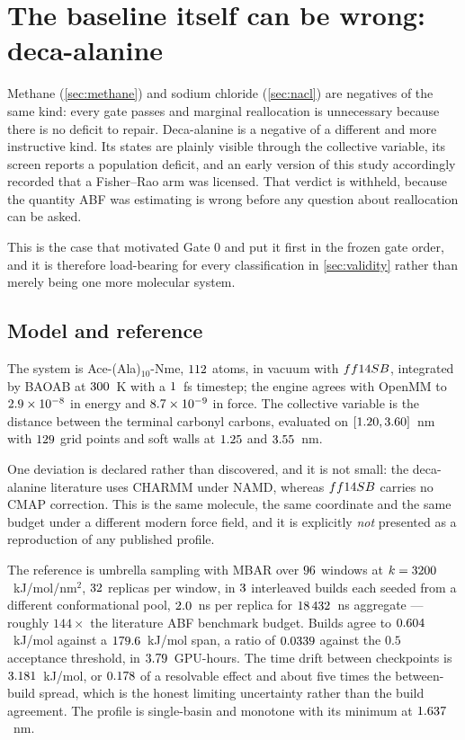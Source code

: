 \section{The baseline itself can be wrong: deca-alanine}
\label{sec:deca}

Methane (\cref{sec:methane}) and sodium chloride (\cref{sec:nacl}) are negatives of the same
kind: every gate passes and marginal reallocation is unnecessary because there is no deficit to
repair. Deca-alanine is a negative of a different and more instructive kind. Its states are
plainly visible through the collective variable, its screen reports a population deficit, and an
early version of this study accordingly recorded that a Fisher--Rao arm was licensed. That
verdict is withheld, because the quantity ABF was estimating is wrong before any question about
reallocation can be asked.

This is the case that motivated Gate 0 and put it first in the frozen gate order, and it is
therefore load-bearing for every classification in \cref{sec:validity} rather than merely being
one more molecular system.

\subsection{Model and reference}

The system is Ace-(Ala)$_{10}$-Nme, $112$ atoms, in vacuum with $ff14SB$, integrated
by BAOAB at $300$~K with a $1$~fs timestep; the engine agrees with OpenMM to
$2.9\times10^{-8}$ in energy and $8.7\times10^{-9}$ in force. The collective variable is the distance between
the terminal carbonyl carbons, evaluated on $[1.20, 3.60]$~nm with $129$ grid points
and soft walls at $1.25$ and $3.55$~nm.

One deviation is declared rather than discovered, and it is not small: the deca-alanine
literature uses CHARMM under NAMD, whereas $ff14SB$ carries no CMAP correction. This is
the same molecule, the same coordinate and the same budget under a different modern force field,
and it is explicitly \emph{not} presented as a reproduction of any published profile.

The reference is umbrella sampling with MBAR over $96$ windows at
$k = 3200$~kJ/mol/nm$^2$, $32$ replicas per window, in $3$
interleaved builds each seeded from a different conformational pool, $2.0$~ns per
replica for $18\,432$~ns aggregate --- roughly $144\times$ the literature ABF benchmark
budget. Builds agree to $0.604$~kJ/mol against a $179.6$~kJ/mol span, a ratio of
$0.0339$ against the $0.5$ acceptance threshold, in $3.79$~GPU-hours. The
time drift between checkpoints is $3.181$~kJ/mol, or $0.178$ of a resolvable
effect and about five times the between-build spread, which is the honest limiting uncertainty
rather than the build agreement. The profile is single-basin and monotone with its minimum at
$1.637$~nm.

